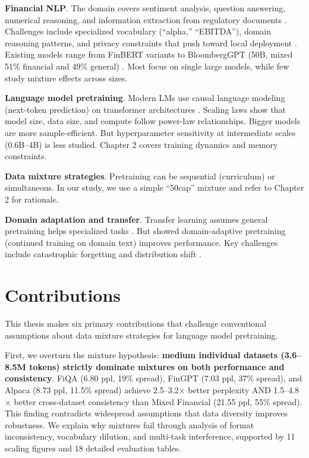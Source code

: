 \textbf{Financial NLP}. The domain covers sentiment analysis, question answering, numerical reasoning, and information extraction from regulatory documents \parencite{araci2019finbert, chen2021finqa}. Challenges include specialized vocabulary (``alpha,'' ``EBITDA''), domain reasoning patterns, and privacy constraints that push toward local deployment \parencite{wu2023bloomberggpt}. Existing models range from FinBERT variants \parencite{araci2019finbert, yang2020finbert} to BloombergGPT (50B, mixed 51\% financial and 49\% general) \parencite{wu2023bloomberggpt}. Most focus on single large models, while few study mixture effects across sizes.

\textbf{Language model pretraining}. Modern LMs use causal language modeling (next-token prediction) on transformer architectures \parencite{vaswani2017attention, radford2019language, brown2020language}. Scaling laws \parencite{kaplan2020scaling, hoffmann2022training} show that model size, data size, and compute follow power-law relationships. Bigger models are more sample-efficient. But hyperparameter sensitivity at intermediate scales (0.6B–4B) is less studied. Chapter 2 covers training dynamics and memory constraints.

\textbf{Data mixture strategies}. Pretraining can be sequential (curriculum) or simultaneous. In our study, we use a simple “50cap” mixture and refer to Chapter 2 for rationale.

\textbf{Domain adaptation and transfer}. Transfer learning assumes general pretraining helps specialized tasks \parencite{devlin2019bert, pan2010transfer}. But \textcite{gururangan2020don} showed domain-adaptive pretraining (continued training on domain text) improves performance. Key challenges include catastrophic forgetting \parencite{kirkpatrick2017overcoming} and distribution shift \parencite{quinonero2009dataset}. 

\section{Contributions}

This thesis makes six primary contributions that challenge conventional assumptions about data mixture strategies for language model pretraining.

First, we overturn the mixture hypothesis: \textbf{medium individual datasets (3.6–8.5M tokens) strictly dominate mixtures on both performance and consistency}. FiQA (6.80 ppl, 19\% spread), FinGPT (7.03 ppl, 37\% spread), and Alpaca (8.73 ppl, 11.5\% spread) achieve 2.5–3.2$\times$ better perplexity AND 1.5–4.8$\times$ better cross-dataset consistency than Mixed Financial (21.55 ppl, 55\% spread). This finding contradicts widespread assumptions that data diversity improves robustness. We explain why mixtures fail through analysis of format inconsistency, vocabulary dilution, and multi-task interference, supported by 11 scaling figures and 18 detailed evaluation tables.

